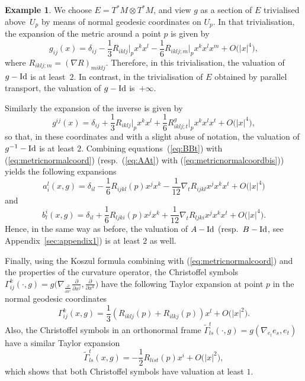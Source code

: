 \documentclass[10pt,a4paper]{amsart}
\numberwithin{equation}{section}
\theoremstyle{definition}
\newtheorem{ex}[thm]{Example}
\begin{document}
\begin{ex} We choose $E=T^*M\otimes T^*M$, and view $g$ as a section of $E$ trivialised above~$U_p$ by means of normal geodesic coordinates on $U_p$. In that trivialisation, the expansion of the metric around a point $p$ is given by
\begin{equation}\label{eq:metricnormalcoord}
g_{ij}(x)=\delta_{ij}-\frac{1}{3}R_{ikl j}\bigg\vert_p x^k x^l-\frac{1}{6} R_{ikl j;m}\bigg\vert_p x^k x^l x^m +O\bigl(|x|^4\bigr),
\end{equation}
where $R_{iklj;m}=(\nabla R)_{m iklj}.$ Therefore, in this trivialisation, the valuation of $g-{\rm Id}$ is at least~$2$. In contrast, in the trivialisation of $E$ obtained by parallel transport, the valuation of $g-{\rm Id}$ is~$+\infty$.

Similarly the expansion of the inverse is given by
 \begin{equation}\label{eq:metricnormalcoordbis}
 g^{ij}(x) =\delta_{ij}+\frac{1}{3}R_{ikl j}\bigg\vert_p x^k x^l+\frac{1}{6} R_{ikl j;t}^g\bigg\vert_px^k x^l x^t +O\bigl(|x|^4\bigr),
 \end{equation}
 so that, in these coordinates and with a slight abuse of notation, the valuation of $g^{-1}-{\rm Id}$ is at least $2$. Combining equations~(\ref{eq:BBt}) with (\ref{eq:metricnormalcoord}) (resp.\ (\ref{eq:AAt}) with (\ref{eq:metricnormalcoordbis})) yields the following expansions \cite[equation~(11)]{AGHM}
\begin{equation*}%
a_i^l(x, g)=\delta_{il}-\frac{1}{6}R_{ijk l}( p) x^j x^k-\frac{1}{12}\nabla_t R_{ijk l}x^j x^k x^t+O\bigl(|x|^4\bigr)\end{equation*}
 and
 \begin{equation*}%
 b_l^i(x, g)=\delta_{il}+\frac{1}{6}R_{ljk i}( p) x^j x^k+\frac{1}{12}\nabla_t R_{ljk i}x^j x^k x^t+O\bigl(|x|^4\bigr).
 \end{equation*}
Hence, in the same way as before, the valuation of $A-{\rm Id}$ (resp.\ $B-{\rm Id}$, see Appendix~\ref{sec:appendix1}) is at least $2$ as well.

Finally, using the Koszul formula combining with (\ref{eq:metricnormalcoord}) and the properties of the curvature operator, the Christoffel symbols $\Gamma_{ij}^k (\cdot, g)=g\bigl(\nabla_{\frac{\partial}{\partial x^i}} \frac{\partial}{\partial x^j}, \frac{\partial}{\partial x^k}\bigr)$ have the following Taylor expansion at point $p$ in the normal geodesic coordinates
\[\Gamma_{ij}^k(x,g)=\frac{1}{3}(R_{i k l j}(p)+R_{i l k j}(p)) x^l+ O\bigl(\vert x\vert^2\bigr).\]
Also, the Christoffel symbols in an orthonormal frame $\tilde\Gamma_{ls}^t(\cdot,g)=g(\nabla_{e_l}e_s,e_t)$ have a similar Taylor expansion
\begin{equation}\label{eq:Gammatilde}
\tilde\Gamma_{ls}^t(x,g)=-\frac{1}{2}R_{li st}(p) x^i+O\bigl(\vert x\vert^2\bigr),
\end{equation}
which shows that both Christoffel symbols have valuation at least $1$.
\end{ex}
\end{document}
